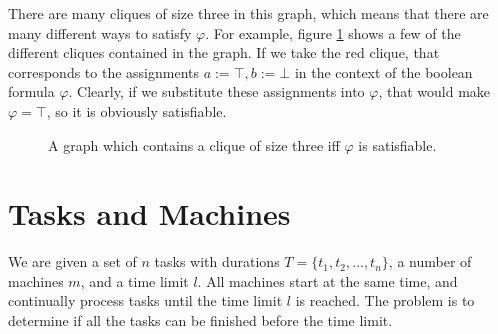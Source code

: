 \documentclass{article}
\begin{document}
There are many cliques of size three in this graph, which means that there are many different ways to satisfy \(\varphi\). For example, figure \ref{q3-example} shows a few of the different cliques contained in the graph. If we take the red clique, that corresponds to the assignments \(a := \top, b := \bot\) in the context of the boolean formula \(\varphi\). Clearly, if we substitute these assignments into \(\varphi\), that would make \(\varphi = \top\), so it is obviously satisfiable.

\begin{figure}[htbp]
	\centering
	\caption{A graph which contains a clique of size three iff \(\varphi\) is satisfiable.}
	\label{q3-example}
\end{figure}

\section{Tasks and Machines}

We are given a set of \(n\) tasks with durations \(T = \{t_1, t_2, \dots, t_n\}\), a number of machines \(m\), and a time limit \(l\). All machines start at the same time, and continually process tasks until the time limit \(l\) is reached. The problem is to determine if all the tasks can be finished before the time limit.
\end{document}
